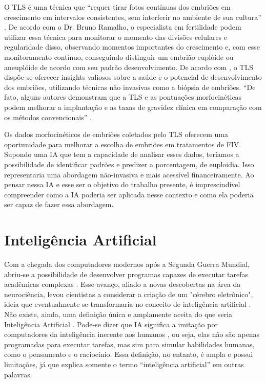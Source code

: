 O TLS é uma técnica que “requer tirar fotos contínuas dos embriões em crescimento em intervalos consistentes, sem interferir no ambiente de sua cultura” \cite{moustakli2024}. De acordo com o Dr. Bruno Ramalho, o especialista em fertilidade podem utilizar essa técnica para monitorar o momento das divisões celulares e regularidade disso, observando momentos importantes do crescimento e, com esse monitoramento contínuo, conseguindo distinguir um embrião euplóide ou aneuplóide de acordo com seu padrão desenvolvimento. De acordo com , o TLS dispõe-se oferecer insights valiosos sobre a saúde e o potencial de desenvolvimento dos embriões, utilizando técnicas não invasivas como a biópsia de embriões. “De fato, alguns autores demonstram que a TLS e as pontuações morfocinéticas podem melhorar a implantação e as taxas de gravidez clínica em comparação com os métodos convencionais” \cite{boucret2021}.

Os dados morfocinéticos de embriões coletados pelo TLS oferecem uma oportunidade para melhorar a escolha de embriões em tratamentos de FIV. Supondo uma IA que tem a capacidade de analisar esses dados, teríamos a possibilidade de identificar padrões e predizer a porcentagem, de euploidia. Isso representaria uma abordagem não-invasiva e mais acessível financeiramente. Ao pensar nessa IA e esse ser o objetivo do trabalho presente, é imprescindível compreender como a IA poderia ser aplicada nesse contexto e como ela poderia ser capaz de fazer essa abordagem. 

\section{Inteligência Artificial}

Com a chegada dos computadores modernos após a Segunda Guerra Mundial, abriu-se a possibilidade de desenvolver programas capazes de executar tarefas acadêmicas complexas \cite{jeffery2022}. Esse avanço, aliado a novas descobertas na área da neurociência, levou cientistas a considerar a criação de um "cérebro eletrônico", ideia que eventualmente se transformaria no conceito de inteligência artificial \cite{jeffery2022}. Não existe, ainda, uma definição  única e amplamente aceita do que seria Inteligência Artificial \cite{sheikh2023}. Pode-se dizer que IA significa a imitação por computadores da inteligência inerente aos humanos \cite{sheikh2023}, ou seja, elas não são apenas programadas para executar tarefas, mas sim para simular habilidades humanas, como o pensamento e o raciocínio. Essa definição, no entanto, é ampla e possui limitações, já que explica somente o termo “inteligência artificial” em outras palavras. 

